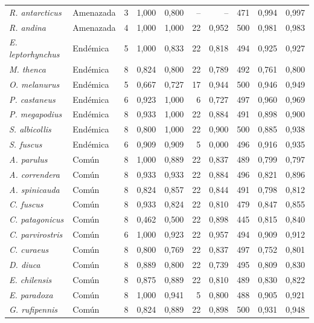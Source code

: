 {\begin{longtable}{@{}l l r r r r r r r r@{}}
    \textit{R. antarcticus} & Amenazada & 3 & 1,000 & 0,800 & -- & -- & 471 & 0,994 & 0,997 \\
    \textit{R. andina} & Amenazada & 4 & 1,000 & 1,000 & 22 & 0,952 & 500 & 0,981 & 0,983 \\
    \textit{E. leptorhynchus} & Endémica & 5 & 1,000 & 0,833 & 22 & 0,818 & 494 & 0,925 & 0,927 \\
    \textit{M. thenca} & Endémica & 8 & 0,824 & 0,800 & 22 & 0,789 & 492 & 0,761 & 0,800 \\
    \textit{O. melanurus} & Endémica & 5 & 0,667 & 0,727 & 17 & 0,944 & 500 & 0,946 & 0,949 \\
    \textit{P. castaneus} & Endémica & 6 & 0,923 & 1,000 & 6 & 0,727 & 497 & 0,960 & 0,969 \\
    \textit{P. megapodius} & Endémica & 8 & 0,933 & 1,000 & 22 & 0,884 & 491 & 0,898 & 0,900 \\
    \textit{S. albicollis} & Endémica & 8 & 0,800 & 1,000 & 22 & 0,900 & 500 & 0,885 & 0,938 \\
    \textit{S. fuscus} & Endémica & 6 & 0,909 & 0,909 & 5 & 0,000 & 496 & 0,916 & 0,935 \\
    \textit{A. parulus} & Común & 8 & 1,000 & 0,889 & 22 & 0,837 & 489 & 0,799 & 0,797 \\
    \textit{A. correndera} & Común & 8 & 0,933 & 0,933 & 22 & 0,884 & 496 & 0,821 & 0,896 \\
    \textit{A. spinicauda} & Común & 8 & 0,824 & 0,857 & 22 & 0,844 & 491 & 0,798 & 0,812 \\
    \textit{C. fuscus} & Común & 8 & 0,933 & 0,824 & 22 & 0,810 & 479 & 0,847 & 0,855 \\
    \textit{C. patagonicus} & Común & 8 & 0,462 & 0,500 & 22 & 0,898 & 445 & 0,815 & 0,840 \\
    \textit{C. parvirostris} & Común & 6 & 1,000 & 0,923 & 22 & 0,957 & 494 & 0,909 & 0,912 \\
    \textit{C. curaeus} & Común & 8 & 0,800 & 0,769 & 22 & 0,837 & 497 & 0,752 & 0,801 \\
    \textit{D. diuca} & Común & 8 & 0,889 & 0,800 & 22 & 0,739 & 495 & 0,809 & 0,830 \\
    \textit{E. chilensis} & Común & 8 & 0,875 & 0,889 & 22 & 0,810 & 489 & 0,830 & 0,822 \\
    \textit{E. paradoxa} & Común & 8 & 1,000 & 0,941 & 5 & 0,800 & 488 & 0,905 & 0,921 \\
    \textit{G. rufipennis} & Común & 8 & 0,824 & 0,889 & 22 & 0,898 & 500 & 0,931 & 0,948 \\

\end{longtable}}
